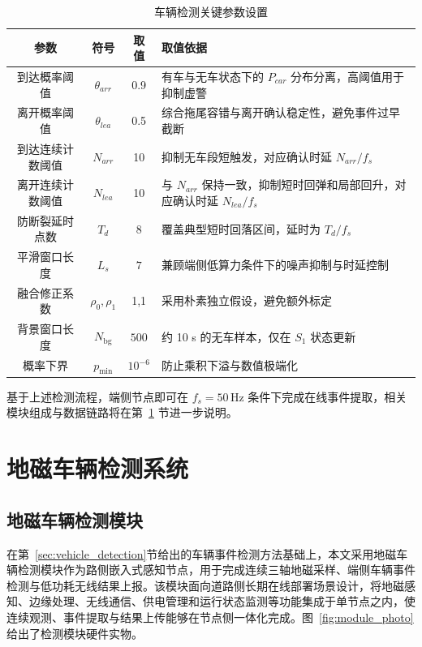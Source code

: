 \documentclass{xdupgthesis}
\makeatletter
\newcommand{\Fs}{\ensuremath{50\,\mathrm{Hz}}}
\newcommand{\SmoothLen}{\ensuremath{7}}        %
\newcommand{\BgWinPts}{\ensuremath{500}}       %
\newcommand{\ProbFloor}{\ensuremath{10^{-6}}}  %
\providecommand{\FloatBarrier}{}
\makeatother
\begin{document}
\begin{table}[!htbp]
    \centering
    \caption{车辆检测关键参数设置}
    \label{tab:det_param}
    \begin{tabular}{c c c >{\raggedright\arraybackslash}p{6.4cm}}
        \hline
        参数 & 符号 & 取值 & 取值依据 \\
        \hline
        到达概率阈值 & $\theta_{arr}$ & 0.9 & 有车与无车状态下的 $P_{car}$ 分布分离，高阈值用于抑制虚警 \\
        离开概率阈值 & $\theta_{lea}$ & 0.5 & 综合拖尾容错与离开确认稳定性，避免事件过早截断 \\
        到达连续计数阈值 & $N_{arr}$ & 10 & 抑制无车段短触发，对应确认时延 $N_{arr}/f_s$ \\
        离开连续计数阈值 & $N_{lea}$ & 10 & 与 $N_{arr}$ 保持一致，抑制短时回弹和局部回升，对应确认时延 $N_{lea}/f_s$ \\
        防断裂延时点数 & $T_d$ & 8 & 覆盖典型短时回落区间，延时为 $T_d/f_s$ \\
        \addlinespace[2pt]
        平滑窗口长度 & $L_s$ & \SmoothLen & 兼顾端侧低算力条件下的噪声抑制与时延控制 \\
        融合修正系数 & $\rho_0,\rho_1$ & 1,1 & 采用朴素独立假设，避免额外标定 \\
        背景窗口长度 & $N_{\mathrm{bg}}$ & \BgWinPts & 约 10 s 的无车样本，仅在 $S_1$ 状态更新 \\
        概率下界 & $p_{\min}$ & \ProbFloor & 防止乘积下溢与数值极端化 \\
        \hline
    \end{tabular}
\end{table}

基于上述检测流程，端侧节点即可在 $f_s=\Fs$ 条件下完成在线事件提取，相关模块组成与数据链路将在第~\ref{sec:ch2_system} 节进一步说明。

\FloatBarrier

\section{地磁车辆检测系统}
\label{sec:ch2_system}

\subsection{地磁车辆检测模块}
\label{sec:ch2_module}

在第~\ref{sec:vehicle_detection}节给出的车辆事件检测方法基础上，本文采用地磁车辆检测模块作为路侧嵌入式感知节点，用于完成连续三轴地磁采样、端侧车辆事件检测与低功耗无线结果上报。该模块面向道路侧长期在线部署场景设计，将地磁感知、边缘处理、无线通信、供电管理和运行状态监测等功能集成于单节点之内，使连续观测、事件提取与结果上传能够在节点侧一体化完成。图~\ref{fig:module_photo}给出了检测模块硬件实物。
\end{document}
